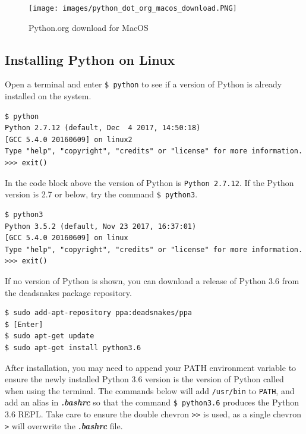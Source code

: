 \documentclass{book}
\begin{document}
\begin{figure}
\centering
\texttt{[image: images/python\_dot\_org\_macos\_download.PNG]}
\caption{Python.org download for MacOS}
\end{figure}
    




    
        \subsection{Installing Python on
Linux}\label{installing-python-on-linux}

Open a terminal and enter \lstinline!$ python! to see if a version of
Python is already installed on the system.

\begin{lstlisting}
$ python
Python 2.7.12 (default, Dec  4 2017, 14:50:18)
[GCC 5.4.0 20160609] on linux2
Type "help", "copyright", "credits" or "license" for more information.
>>> exit()
\end{lstlisting}

In the code block above the version of Python is
\lstinline!Python 2.7.12!. If the Python version is 2.7 or below, try
the command \lstinline!$ python3!.

\begin{lstlisting}
$ python3
Python 3.5.2 (default, Nov 23 2017, 16:37:01) 
[GCC 5.4.0 20160609] on linux
Type "help", "copyright", "credits" or "license" for more information.
>>> exit()
\end{lstlisting}

If no version of Python is shown, you can download a release of Python
3.6 from the deadsnakes package repository.

\begin{lstlisting}
$ sudo add-apt-repository ppa:deadsnakes/ppa
$ [Enter]
$ sudo apt-get update
$ sudo apt-get install python3.6
\end{lstlisting}

After installation, you may need to append your PATH environment
variable to ensure the newly installed Python 3.6 version is the version
of Python called when using the terminal. The commands below will add
\lstinline!/usr/bin! to \lstinline!PATH!, and add an alias in
\textbf{\emph{.bashrc}} so that the command \lstinline!$ python3.6!
produces the Python 3.6 REPL. Take care to ensure the double chevron
\lstinline!>>! is used, as a single chevron \lstinline!>! will overwrite
the \textbf{\emph{.bashrc}} file.
\end{document}

